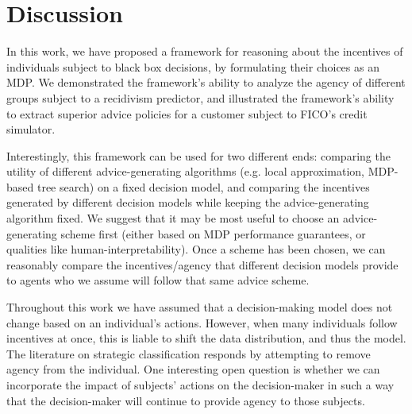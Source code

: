 \section{Discussion}
\label{sec:discussion}

In this work, we have proposed a framework for reasoning about the incentives of individuals subject to black box decisions, by formulating their choices as an MDP. We demonstrated the framework's ability to analyze the agency of different groups subject to a recidivism predictor, and illustrated the framework's ability to extract superior advice policies for a customer subject to FICO's credit simulator.

Interestingly, this framework can be used for two different ends: comparing the utility of different advice-generating algorithms (e.g. local approximation, MDP-based tree search) on a fixed decision model, and comparing the incentives generated by different decision models while keeping the advice-generating algorithm fixed. We suggest that it may be most useful to choose an advice-generating scheme first (either based on MDP performance guarantees, or qualities like human-interpretability). Once a scheme has been chosen, we can reasonably compare the incentives/agency that different decision models provide to agents who we assume will follow that same advice scheme. 

Throughout this work we have assumed that a decision-making model does not change based on an individual's actions. However, when many individuals follow incentives at once, this is liable to shift the data distribution, and thus the model. The literature on strategic classification responds by attempting to remove agency from the individual. One interesting open question is whether we can incorporate the impact of subjects' actions on the decision-maker in such a way that the decision-maker will continue to provide agency to those subjects.

